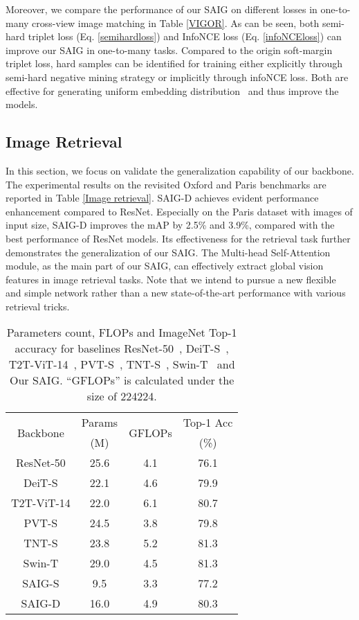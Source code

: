 \documentclass[sn-basic,iicol]{sn-jnl}
\theoremstyle{thmstyletwo}\newtheorem{example}{Example}\newtheorem{remark}{Remark}
\theoremstyle{thmstylethree}\newtheorem{definition}{Definition}
\begin{document}
Moreover, we compare the performance of our SAIG on different losses in one-to-many cross-view image matching in Table \ref{VIGOR}. As can be seen, both semi-hard triplet loss (Eq. \ref{semihardloss}) and InfoNCE loss (Eq. \ref{infoNCEloss}) can improve our SAIG in one-to-many tasks. Compared to the origin soft-margin triplet loss, hard samples can be identified for training either explicitly through semi-hard negative mining strategy or implicitly through infoNCE loss. Both are effective for generating uniform embedding distribution~\citep{wang2021understanding} and thus improve the models.





\subsection{Image Retrieval}
In this section, we focus on validate the generalization capability of our backbone. The experimental results on the revisited Oxford and Paris benchmarks are reported in Table \ref{Image retrieval}. SAIG-D achieves evident performance enhancement compared to ResNet. Especially on the Paris dataset with images of  input size, SAIG-D improves the mAP by 2.5\% and 3.9\%, compared with the best performance of ResNet models. Its effectiveness for the retrieval task further demonstrates the generalization of our SAIG. The Multi-head Self-Attention module, as the main part of our SAIG, can effectively extract global vision features in image retrieval tasks. Note that we intend to pursue a new flexible and simple network rather than a new state-of-the-art performance with various retrieval tricks. 


\begin{table}
\setlength{\abovecaptionskip}{0.2cm}
\centering
\begin{tabular}{c|c|c|c}
\toprule
\multirow{2}{*}{Backbone} & Params & \multirow{2}{*}{GFLOPs} & Top-1 Acc \\ 
 ~&(M) & ~ &(\%) \\\midrule
ResNet-50 & 25.6 & 4.1 & 76.1 \\
DeiT-S & 22.1 & 4.6 & 79.9 \\
T2T-ViT-14 & 22.0 & 6.1 & 80.7 \\
PVT-S  & 24.5 & 3.8 & 79.8 \\
TNT-S & 23.8 & 5.2 & 81.3 \\
Swin-T  & 29.0 & 4.5 & 81.3 \\\midrule
SAIG-S & 9.5 & 3.3 & 77.2\\
SAIG-D & 16.0 & 4.9 & 80.3\\ \bottomrule
\end{tabular}

\caption{Parameters count, FLOPs and ImageNet Top-1 accuracy for baselines ResNet-50~\protect\citep{heResNet2016}, DeiT-S~\protect\citep{DeiT}, T2T-ViT-14~\protect\citep{T2T-ViT2021}, PVT-S~\protect\citep{PVT2021}, TNT-S~\protect\citep{TNT2021}, Swin-T~\protect\citep{Swin-T2021} and Our SAIG. “GFLOPs” is calculated under the size of 224224.}
\label{Imagenet classification}
\end{table}
\end{document}
